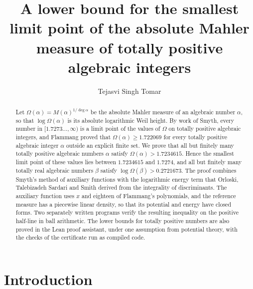 \documentclass[11pt]{amsart}
\theoremstyle{remark}
\numberwithin{equation}{section}
\newcommand{\EMzero}{1.7234615}
\newcommand{\HalfM}{0.2721673}
\newcommand{\FlamVal}{1.722069}
\newcommand{\SmyEllSq}{1.7273}
\newcommand{\SmyEllUp}{1.7274}
\begin{document}
\title[Totally positive algebraic integers]{A lower bound for the smallest limit point of the absolute Mahler measure of totally positive algebraic integers}
\author{Tejasvi Singh Tomar}
\renewcommand{\urladdrname}{{\itshape ORCID}}

\begin{abstract}
Let $\Omega(\alpha)=M(\alpha)^{1/\deg\alpha}$ be the absolute Mahler measure of an algebraic number $\alpha$, so that $\log\Omega(\alpha)$ is its absolute logarithmic Weil height. By work of Smyth, every number in $[\SmyEllSq\ldots,\infty)$ is a limit point of the values of $\Omega$ on totally positive algebraic integers, and Flammang proved that $\Omega(\alpha)\ge\FlamVal$ for every totally positive algebraic integer $\alpha$ outside an explicit finite set. We prove that all but finitely many totally positive algebraic numbers $\alpha$ satisfy $\Omega(\alpha)>\EMzero$. Hence the smallest limit point of these values lies between $\EMzero$ and $\SmyEllUp$, and all but finitely many totally real algebraic numbers $\beta$ satisfy $\log\Omega(\beta)>\HalfM$. The proof combines Smyth's method of auxiliary functions with the logarithmic energy term that Orloski, Talebizadeh Sardari and Smith derived from the integrality of discriminants. The auxiliary function uses $x$ and eighteen of Flammang's polynomials, and the reference measure has a piecewise linear density, so that its potential and energy have closed forms. Two separately written programs verify the resulting inequality on the positive half-line in ball arithmetic. The lower bounds for totally positive numbers are also proved in the Lean proof assistant, under one assumption from potential theory, with the checks of the certificate run as compiled code.
\end{abstract}

\maketitle

\section{Introduction}\label{sec:intro}
\end{document}
